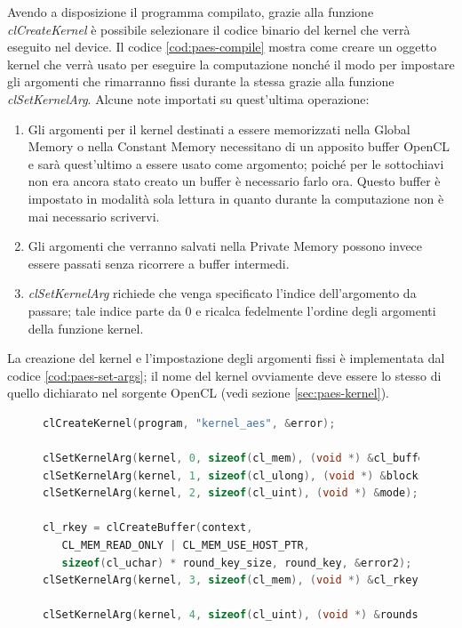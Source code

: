 \documentclass[12pt,a4paper,oneside]{book}
\begin{document}
Avendo a disposizione il programma compilato, grazie alla funzione \textit{clCreateKernel} è possibile selezionare il codice binario del kernel che verrà eseguito nel device. Il codice \ref{cod:paes-compile} mostra come creare un oggetto kernel che verrà usato per eseguire la computazione nonché il modo per impostare gli argomenti che rimarranno fissi durante la stessa grazie alla funzione \textit{clSetKernelArg}. Alcune note importati su quest'ultima operazione:
\begin{enumerate}
\item Gli argomenti per il kernel destinati a essere memorizzati nella Global Memory o nella Constant Memory necessitano di un apposito buffer \ac{OpenCL} e sarà quest'ultimo a essere usato come argomento; poiché per le sottochiavi non era ancora stato creato un buffer è necessario farlo ora. Questo buffer è impostato in modalità sola lettura in quanto durante la computazione non è mai necessario scrivervi.
\item Gli argomenti che verranno salvati nella Private Memory possono invece essere passati senza ricorrere a buffer intermedi.
\item \textit{clSetKernelArg} richiede che venga specificato l'indice dell'argomento da passare; tale indice parte da 0 e ricalca fedelmente l'ordine degli argomenti della funzione kernel.
\end{enumerate}
La creazione del kernel e l'impostazione degli argomenti fissi è implementata dal codice \ref{cod:paes-set-args}; il nome del kernel ovviamente deve essere lo stesso di quello dichiarato nel sorgente \ac{OpenCL} (vedi sezione \ref{sec:paes-kernel}).

\begin{figure}
\begin{lstlisting}[caption={\textit{Creazione del kernel e impostazione degli argomenti fissi.}},label={cod:paes-set-args},language=C]
clCreateKernel(program, "kernel_aes", &error);

clSetKernelArg(kernel, 0, sizeof(cl_mem), (void *) &cl_buffer);
clSetKernelArg(kernel, 1, sizeof(cl_ulong), (void *) &blocks);
clSetKernelArg(kernel, 2, sizeof(cl_uint), (void *) &mode);

cl_rkey = clCreateBuffer(context,
   CL_MEM_READ_ONLY | CL_MEM_USE_HOST_PTR,
   sizeof(cl_uchar) * round_key_size, round_key, &error2);
clSetKernelArg(kernel, 3, sizeof(cl_mem), (void *) &cl_rkey);

clSetKernelArg(kernel, 4, sizeof(cl_uint), (void *) &rounds);
\end{lstlisting}
\end{figure}
\end{document}
